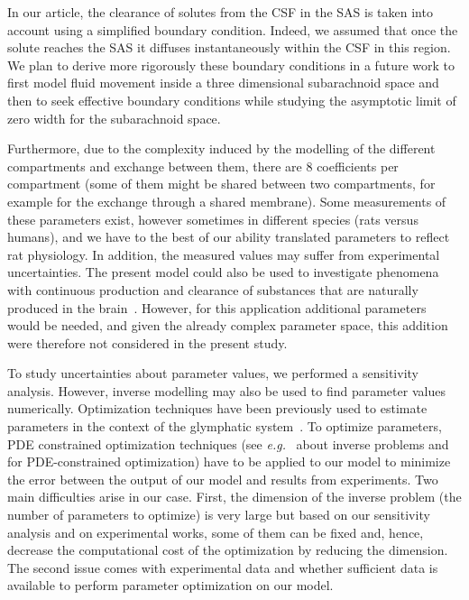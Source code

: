 \documentclass[a4paper,11pt]{article}
\newcommand{\eg}{\emph{e.g.}\;}
\newcommand{\etal}{\emph{et al.}\;}
\newcommand{\1}{^{(1)}}
\newcommand{\2}{^{(2)}}
\begin{document}
In our article, the clearance of solutes from the CSF in the SAS is taken into account using a simplified boundary condition. Indeed, we assumed that once the solute reaches the SAS it diffuses instantaneously within the CSF in this region. We plan to derive more rigorously these boundary conditions in a future work to first model fluid movement inside a three dimensional subarachnoid space and then to seek effective boundary conditions while studying the asymptotic limit of zero width for the subarachnoid space. 


Furthermore, due to the complexity induced by the modelling of the different compartments and exchange between them, there are $8$ coefficients per compartment (some of them might be shared between two compartments, for example for the exchange through a shared membrane). Some measurements of these parameters  exist, however sometimes in different species (rats versus humans), and we have to the best of our ability translated parameters to reflect rat physiology. In addition, the measured values may suffer from experimental uncertainties. %
The present model could also be used to investigate phenomena with continuous production and clearance of substances that are naturally produced in the brain~\cite{mawuenyega2010decreased, bateman2006human}. However, for this application additional parameters would be needed, and given the already complex parameter space, this addition were therefore not considered in the present study.

To study uncertainties about parameter values, we performed a sensitivity analysis. However, inverse modelling may also be used to find parameter values numerically. %
Optimization techniques have been previously used to estimate parameters in the context of the glymphatic system~\cite{valnes_apparent_2020}. %
To optimize parameters, PDE constrained optimization techniques (see \eg~\cite{Tarantola} about inverse problems and~\cite{antil2018frontiers} for PDE-constrained optimization) have to be applied to our model to minimize the error between the output of our model and results from experiments. Two main difficulties arise in our case. First, the dimension of the inverse problem (the number of parameters to optimize) is very large but based on our sensitivity analysis and on experimental works, some of them can be fixed and, hence, decrease the computational cost of the optimization by reducing the dimension. The second issue comes with experimental data and whether sufficient data is available to perform parameter optimization on our model. %
\end{document}
